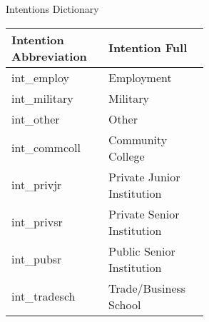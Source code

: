 \begin{threeparttable}
    \caption{Intentions Dictionary} %
\label{tab:intentions} %
    \begin{tabular}{ p{0.25\linewidth} p{0.3\linewidth} }     %
    \toprule %
    Intention Abbreviation                        & Intention Full \\ %
\midrule
             
int\_employ                  & Employment  \\
int\_military                & Military      \\
int\_other             &       Other      \\
int\_commcoll         &   Community College    \\
int\_privjr                & Private Junior Institution     \\
int\_privsr                & Private Senior Institution     \\
int\_pubsr                &  Public Senior Institution    \\
int\_tradesch                & Trade/Business School     \\

\midrule
\end{tabular}

\end{threeparttable}